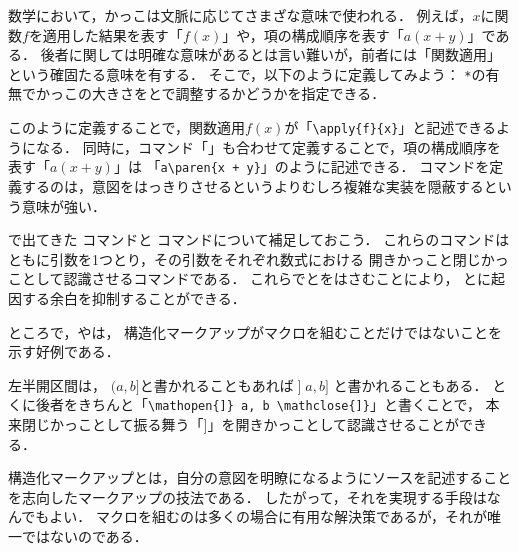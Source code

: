 \begin{Ex} \label{Ex:paren}
    数学において，かっこは文脈に応じてさまざな意味で使われる．
    例えば，\(x\)に関数\(f\)を適用した結果を表す「\(f(x)\)」や，項の構成順序を表す「\(a(x + y)\)」である．
    後者に関しては明確な意味があるとは言い難いが，前者には「関数適用」という確固たる意味を有する．
    そこで，以下のように定義してみよう：
    \lstinline|*|の有無でかっこの大きさをとで調整するかどうかを指定できる．

    このように定義することで，関数適用\(f(x)\)が「\lstinline|\apply{f}{x}|」と記述できるようになる．
    同時に，コマンド「」も合わせて定義することで，項の構成順序を表す「\(a(x + y)\)」は
    「\lstinline|a\paren{x + y}|」のように記述できる．
    コマンドを定義するのは，意図をはっきりさせるというよりむしろ複雑な実装を隠蔽するという意味が強い．
\end{Ex}

で出てきた%
%
%
コマンドと
%
%
コマンドについて補足しておこう．
これらのコマンドはともに引数を1つとり，その引数をそれぞれ数式における
開きかっこと閉じかっことして認識させるコマンドである．
これらでとをはさむことにより，
とに起因する余白を抑制することができる．

ところで，やは，
構造化マークアップがマクロを組むことだけではないことを示す好例である．

\begin{Ex} \label{Ex:mathopenclose}
    左半開区間は，
    \(\mathopen{(}a, b \mathclose{]}\)と書かれることもあれば\(\mathopen{]}a, b\mathclose{]}\)
    と書かれることもある．
    とくに後者をきちんと「\lstinline|\mathopen{]} a, b \mathclose{]}|」と書くことで，
    本来閉じかっことして振る舞う「\(\mathclose{]}\)」を開きかっことして認識させることができる．
\end{Ex}

構造化マークアップとは，自分の意図を明瞭になるようにソースを記述することを志向したマークアップの技法である．
したがって，それを実現する手段はなんでもよい．
マクロを組むのは多くの場合に有用な解決策であるが，それが唯一ではないのである．